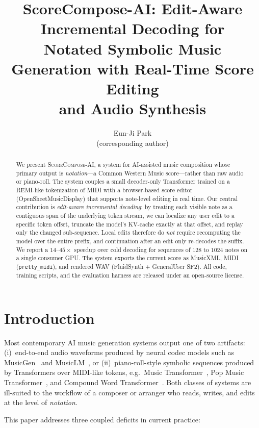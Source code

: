 \documentclass[11pt,a4paper]{article}
\title{\textbf{ScoreCompose-AI}: Edit-Aware Incremental Decoding for\\
       Notated Symbolic Music Generation with Real-Time Score Editing\\
       and Audio Synthesis}
\author{Eun-Ji Park \\ \small (corresponding author)}
\date{}
\begin{document}
\maketitle

\begin{abstract}
We present \textsc{ScoreCompose-AI}, a system for AI-assisted music
composition whose primary output is \emph{notation}---a Common Western
Music score---rather than raw audio or piano-roll. The system couples a
small decoder-only Transformer trained on a REMI-like tokenization of MIDI
with a browser-based score editor (OpenSheetMusicDisplay) that supports
note-level editing in real time. Our central contribution is
\emph{edit-aware incremental decoding}: by treating each visible note as a
contiguous span of the underlying token stream, we can localize any user
edit to a specific token offset, truncate the model's KV-cache exactly at
that offset, and replay only the changed sub-sequence. Local edits
therefore do \emph{not} require recomputing the model over the entire
prefix, and continuation after an edit only re-decodes the suffix. We
report a $14$--$45\times$ speedup over cold decoding for sequences of $128$
to $1024$ notes on a single consumer GPU. The system exports the current
score as MusicXML, MIDI (\texttt{pretty\_midi}), and rendered WAV
(FluidSynth + GeneralUser SF2).  All code, training scripts, and the
evaluation harness are released under an open-source license.
\end{abstract}

\section{Introduction}

Most contemporary AI music generation systems output one of two artifacts:
(i)~end-to-end audio waveforms produced by neural codec models such as
MusicGen~\cite{copet2023simple} and MusicLM~\cite{agostinelli2023musiclm},
or (ii)~piano-roll-style symbolic sequences produced by Transformers over
MIDI-like tokens, e.g.\ Music Transformer~\cite{huang2018music}, Pop Music
Transformer~\cite{huang2020pop}, and Compound Word
Transformer~\cite{hsiao2021compound}. Both classes of systems are
ill-suited to the workflow of a composer or arranger who reads, writes,
and edits at the level of \emph{notation}.

This paper addresses three coupled deficits in current practice:
\end{document}
